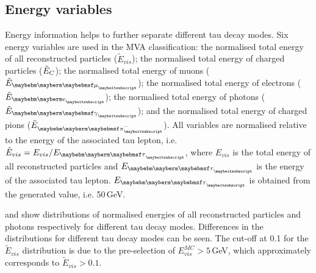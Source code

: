 \subsection{Energy variables}

Energy information helps to further separate different tau decay modes. Six energy variables are used in the MVA classification: the normalised total energy of all reconstructed particles ($\tilde{E}_{vis}$); the normalised total energy of charged particles ($\tilde{E}_{C}$); the normalised total energy of muons ($\tilde{E}_{\Pmu}$); the normalised total energy of electrons ($\tilde{E}_{\Pe}$); the normalised total energy of photons ($\tilde{E}_{\Pgg}$); and the normalised total energy of charged pions ($\tilde{E}_{\Pgpm}$). All variables are normalised relative to the energy of the associated tau lepton, i.e. $\tilde{E}_{vis} = E_{vis} / E_{\Ptau}$, where $E_{vis} $ is the total energy of all reconstructed particles and $E_{\Ptau}$ is the energy of the associated tau lepton.  $E_{\Ptau}$ is obtained from the generated value, i.e. 50\,GeV.


 and  show distributions of normalised energies of all reconstructed particles and photons respectively for different tau decay modes. Differences in the distributions for  different tau decay modes can be seen. The cut-off at 0.1 for the $\tilde{E}_{vis}$ distribution is due to the pre-selection of  $E_{vis}^{MC}>5$\,GeV, which approximately corresponds to  $\tilde{E}_{vis}>0.1$.



